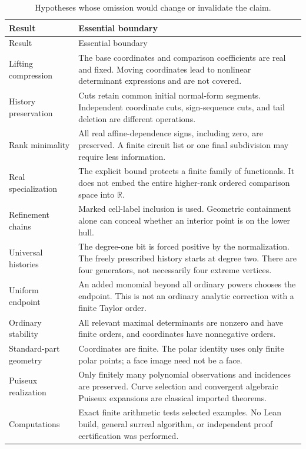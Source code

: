 \documentclass[11pt,a4paper]{article}
\numberwithin{equation}{section}
\theoremstyle{plain}
\newcommand{\R}{\mathbb R}
\begin{document}
\begin{longtable}{@{}p{}p{}@{}}
\caption{Hypotheses whose omission would change or invalidate the claim.}\label{poly:ts:tab:audit}\\
\toprule
Result & Essential boundary\\
\midrule
\endfirsthead
\toprule
Result & Essential boundary\\
\midrule
\endhead
\bottomrule
\endfoot
Lifting compression & The base coordinates and comparison coefficients
are real and fixed. Moving coordinates lead to nonlinear determinant
expressions and are not covered.\\[4pt]
History preservation & Cuts retain common initial normal-form segments.
Independent coordinate cuts, sign-sequence cuts, and tail deletion are
different operations.\\[4pt]
Rank minimality & All real affine-dependence signs, including zero, are
preserved. A finite circuit list or one final subdivision may require less
information.\\[4pt]
Real specialization & The explicit bound protects a finite family of
functionals. It does not embed the entire higher-rank ordered comparison
space into $\R$.\\[4pt]
Refinement chains & Marked cell-label inclusion is used. Geometric
containment alone can conceal whether an interior point is on the
lower hull.\\[4pt]
Universal histories & The degree-one bit is forced positive by the
normalization. The freely prescribed history starts at degree two.
There are four generators, not necessarily four extreme vertices.\\[4pt]
Uniform endpoint & An added monomial beyond all ordinary powers chooses
the endpoint. This is not an ordinary analytic correction with a finite
Taylor order.\\[4pt]
Ordinary stability & All relevant maximal determinants are nonzero and
have finite orders, and coordinates have nonnegative orders.\\[4pt]
Standard-part geometry & Coordinates are finite. The polar identity
uses only finite polar points; a face image need not be a face.\\[4pt]
Puiseux realization & Only finitely many polynomial observations and
incidences are preserved. Curve selection and convergent algebraic
Puiseux expansions are classical imported theorems.\\[4pt]
Computations & Exact finite arithmetic tests selected examples. No Lean
build, general surreal algorithm, or independent proof certification
was performed.\\
\end{longtable}
\end{document}
